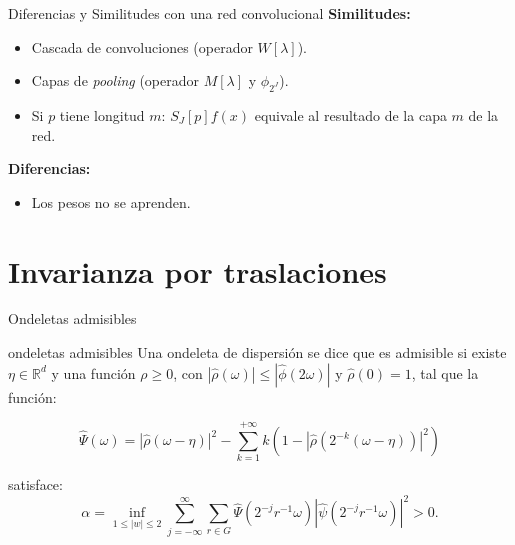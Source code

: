\documentclass[aspectratio=43]{beamer}
\begin{document}
\begin{frame}{Diferencias y Similitudes con una red convolucional}
  \textbf{\textcolor{tudCyan}{Similitudes:}}
  \begin{itemize}
    \item Cascada de convoluciones (operador $W[\lambda]$).
    \item Capas de \textit{pooling} (operador $M[\lambda]$ y $\phi_{2^J}$).
    \item Si $p$ tiene longitud $m$: $S_J[p]f(x)$ equivale al resultado de la capa $m$ de la red.
  \end{itemize}

  \textbf{\textcolor{tudCyan}{Diferencias:}}
  \begin{itemize}
    \item Los pesos no se aprenden.
  \end{itemize}
\end{frame}

\section{Invarianza por traslaciones}

\begin{frame}{Ondeletas admisibles}
  
  \begin{block}{ondeletas admisibles}
    Una ondeleta de dispersión se dice que es admisible si existe $\eta \in \mathbb{R}^d$ y una función $\rho \geq 0$, con $|\widehat{\rho}(\omega)| \leq |\widehat{\phi}(2\omega)|$ y $\widehat{\rho}(0)=1$, tal que la función: 

    \begin{equation*}\label{eq::1.6}
      \widehat{\Psi}(\omega)=|\widehat{\rho}(\omega - \eta)|^2 - \sum_{k=1}^{+\infty} k(1-|\widehat{\rho}(2^{-k}(\omega - \eta))|^2)
    \end{equation*}
      
    \noindent satisface: 
    \begin{equation*} \label{eq::1.7}
      \alpha= \inf_{1\leq|w|\leq2} \sum_{j=-\infty}^{\infty} \sum_{r\in G} \widehat{\Psi} (2^{-j}r^{-1}\omega)|\widehat{\psi}(2^{-j}r^{-1}\omega)|^2>0.
    \end{equation*}
  \end{block}


\end{frame}
\end{document}
